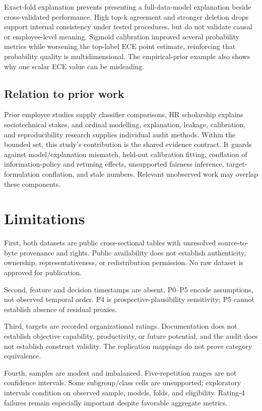 \documentclass[information,article,submit,pdftex,moreauthors]{Definitions/mdpi}
\begin{document}
Exact-fold explanation prevents presenting a full-data-model explanation beside cross-validated performance. High top-k agreement and stronger deletion drops support internal consistency under tested procedures, but do not validate causal or employee-level meaning. Sigmoid calibration improved several probability metrics while worsening the top-label ECE point estimate, reinforcing that probability quality is multidimensional. The empirical-prior example also shows why one scalar ECE value can be misleading.

\subsection{Relation to prior work}

Prior employee studies supply classifier comparisons, HR scholarship explains sociotechnical stakes, and ordinal modelling, explanation, leakage, calibration, and reproducibility research supplies individual audit methods. Within the bounded set, this study's contribution is the shared evidence contract. It guards against model/explanation mismatch, held-out calibration fitting, conflation of information-policy and retuning effects, unsupported fairness inference, target-formulation conflation, and stale numbers. Relevant unobserved work may overlap these components.

\section{Limitations}

First, both datasets are public cross-sectional tables with unresolved source-to-byte provenance and rights. Public availability does not establish authenticity, ownership, representativeness, or redistribution permission. No raw dataset is approved for publication.

Second, feature and decision timestamps are absent. P0–P5 encode assumptions, not observed temporal order. P4 is prospective-plausibility sensitivity; P5 cannot establish absence of residual proxies.

Third, targets are recorded organizational ratings. Documentation does not establish objective capability, productivity, or future potential, and the audit does not establish construct validity. The replication mappings do not prove category equivalence.

Fourth, samples are modest and imbalanced. Five-repetition ranges are not confidence intervals. Some subgroup/class cells are unsupported; exploratory intervals condition on observed sample, models, folds, and eligibility. Rating-4 failures remain especially important despite favorable aggregate metrics.
\end{document}
